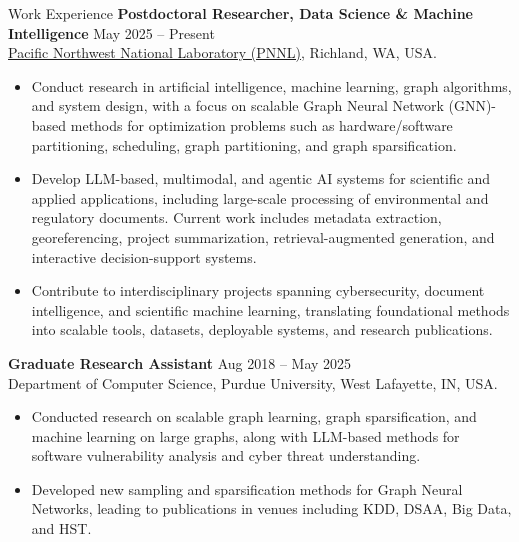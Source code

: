 \documentclass{resume} %
\begin{document}
\begin{rSection}{Work Experience}
\textbf{Postdoctoral Researcher, Data Science \& Machine Intelligence} \hfill May 2025 -- Present\\
\href{https://www.pnnl.gov/}{Pacific Northwest National Laboratory (PNNL)}, Richland, WA, USA.\\
\begin{itemize}
\item Conduct research in artificial intelligence, machine learning, graph algorithms, and system design, with a focus on scalable Graph Neural Network (GNN)-based methods for optimization problems such as hardware/software partitioning, scheduling, graph partitioning, and graph sparsification.

\item Develop LLM-based, multimodal, and agentic AI systems for scientific and applied applications, including large-scale processing of environmental and regulatory documents. Current work includes metadata extraction, georeferencing, project summarization, retrieval-augmented generation, and interactive decision-support systems.

\item Contribute to interdisciplinary projects spanning cybersecurity, document intelligence, and scientific machine learning, translating foundational methods into scalable tools, datasets, deployable systems, and research publications.
\end{itemize}

\textbf{Graduate Research Assistant} \hfill Aug 2018 -- May 2025\\
Department of Computer Science, Purdue University, West Lafayette, IN, USA.\\
\begin{itemize}
\item Conducted research on scalable graph learning, graph sparsification, and machine learning on large graphs, along with LLM-based methods for software vulnerability analysis and cyber threat understanding.

\item Developed new sampling and sparsification methods for Graph Neural Networks, leading to publications in venues including KDD, DSAA, Big Data, and HST.

\end{itemize}


\end{rSection}
\end{document}
